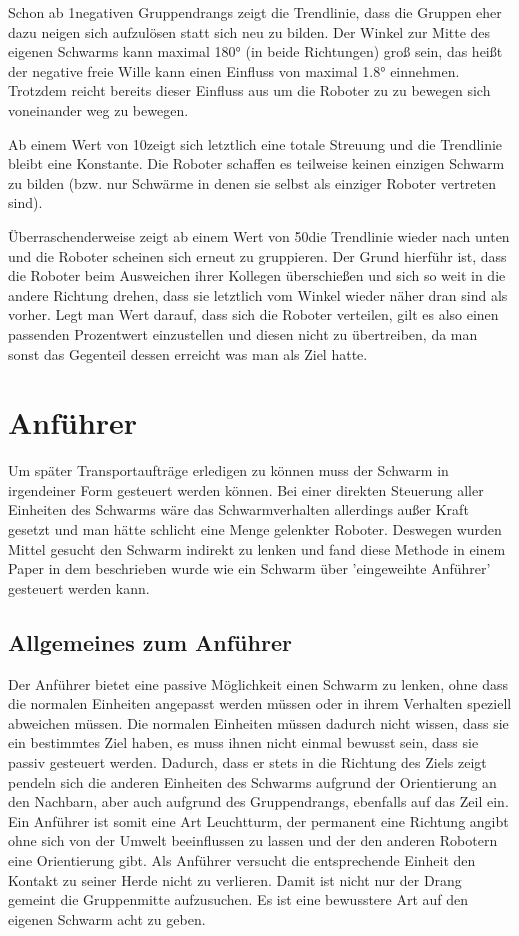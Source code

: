 Schon ab 1\per negativen Gruppendrangs zeigt die Trendlinie, dass die Gruppen eher dazu neigen sich aufzulösen statt sich neu zu bilden. Der Winkel zur Mitte des eigenen Schwarms kann maximal 180° (in beide Richtungen) groß sein, das heißt der negative freie Wille kann einen Einfluss von maximal 1.8° einnehmen. Trotzdem reicht bereits dieser Einfluss aus um die Roboter zu zu bewegen sich voneinander weg zu bewegen.

Ab einem Wert von 10\per zeigt sich letztlich eine totale Streuung und die Trendlinie bleibt eine Konstante. Die Roboter schaffen es teilweise keinen einzigen Schwarm zu bilden (bzw. nur Schwärme in denen sie selbst als einziger Roboter vertreten sind).

Überraschenderweise zeigt ab einem Wert von 50\per die Trendlinie wieder nach unten und die Roboter scheinen sich erneut zu gruppieren. Der Grund hierführ ist, dass die Roboter beim Ausweichen ihrer Kollegen überschießen und sich so weit in die andere Richtung drehen, dass sie letztlich vom Winkel wieder näher dran sind als vorher. Legt man Wert darauf, dass sich die Roboter verteilen, gilt es also einen passenden Prozentwert einzustellen und diesen nicht zu übertreiben, da man sonst das Gegenteil dessen erreicht was man als Ziel hatte.

\section{Anführer}

Um später Transportaufträge erledigen zu können muss der Schwarm in irgendeiner Form gesteuert werden können. Bei einer direkten Steuerung aller Einheiten des Schwarms wäre das Schwarmverhalten allerdings außer Kraft gesetzt und man hätte schlicht eine Menge gelenkter Roboter. Deswegen wurden Mittel gesucht den Schwarm indirekt zu lenken und fand diese Methode in einem Paper  in dem beschrieben wurde wie ein Schwarm über 'eingeweihte Anführer' gesteuert werden kann.

\subsection*{Allgemeines zum Anführer}

Der Anführer bietet eine passive Möglichkeit einen Schwarm zu lenken, ohne dass die normalen Einheiten angepasst werden müssen oder in ihrem Verhalten speziell abweichen müssen. Die normalen Einheiten müssen dadurch nicht wissen, dass sie ein bestimmtes Ziel haben, es muss ihnen nicht einmal bewusst sein, dass sie passiv gesteuert werden. Dadurch, dass er stets in die Richtung des Ziels zeigt pendeln sich die anderen Einheiten des Schwarms aufgrund der Orientierung an den Nachbarn, aber auch aufgrund des Gruppendrangs, ebenfalls auf das Zeil ein. Ein Anführer ist somit eine Art Leuchtturm, der permanent eine Richtung angibt ohne sich von der Umwelt beeinflussen zu lassen und der den anderen Robotern eine Orientierung gibt.
Als Anführer versucht die entsprechende Einheit den Kontakt zu seiner Herde nicht zu verlieren. Damit ist nicht nur der Drang gemeint die Gruppenmitte aufzusuchen. Es ist eine bewusstere Art auf den eigenen Schwarm acht zu geben.

